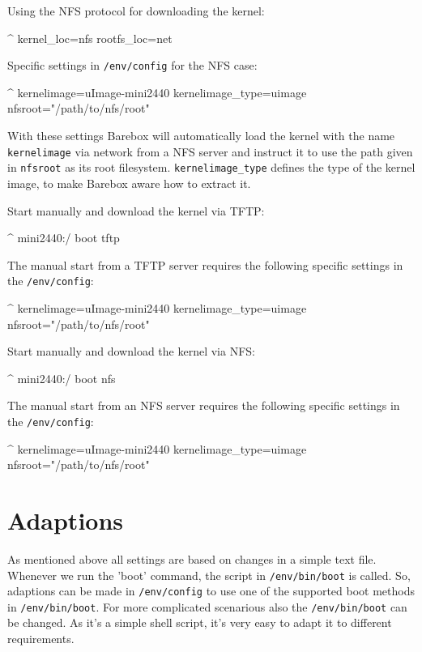 Using the NFS protocol for downloading the kernel:

\begin{ptxshell}[escapechar=|]{^}
kernel_loc=nfs
rootfs_loc=net
\end{ptxshell}

Specific settings in \texttt{/env/config} for the NFS case:

\begin{ptxshell}[escapechar=|]{^}
kernelimage=uImage-mini2440
kernelimage_type=uimage
nfsroot="/path/to/nfs/root"
\end{ptxshell}

With these settings Barebox will automatically load the kernel with the name
\texttt{kernelimage} via network from a NFS server and instruct it to use
the path given in \texttt{nfsroot} as its root filesystem.
\texttt{kernelimage\_type} defines the type of the kernel image, to make
Barebox aware how to extract it.

Start manually and download the kernel via TFTP:

\begin{ptxshell}[escapechar=|]{^}
mini2440:/ boot tftp
\end{ptxshell}

The manual start from a TFTP server requires the following specific settings
in the \texttt{/env/config}:

\begin{ptxshell}[escapechar=|]{^}
kernelimage=uImage-mini2440
kernelimage_type=uimage
nfsroot="/path/to/nfs/root"
\end{ptxshell}

Start manually and download the kernel via NFS:

\begin{ptxshell}[escapechar=|]{^}
mini2440:/ boot nfs
\end{ptxshell}

The manual start from an NFS server requires the following specific settings
in the \texttt{/env/config}:

\begin{ptxshell}[escapechar=|]{^}
kernelimage=uImage-mini2440
kernelimage_type=uimage
nfsroot="/path/to/nfs/root"
\end{ptxshell}

\section{Adaptions}

As mentioned above all settings are based on changes in a simple text file.
Whenever we run the 'boot' command, the script in \texttt{/env/bin/boot} is
called. So, adaptions can be made in \texttt{/env/config} to use one of the
supported boot methods in \texttt{/env/bin/boot}. For more complicated
scenarious also the \texttt{/env/bin/boot} can be changed. As it's a simple
shell script, it's very easy to adapt it to different requirements.
